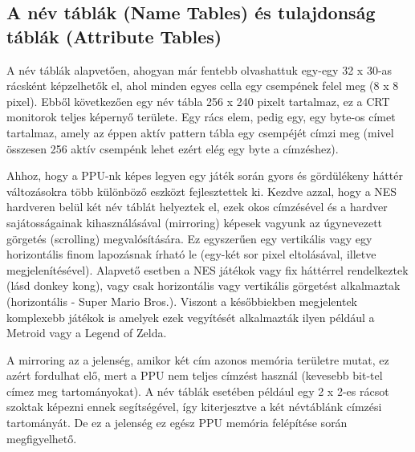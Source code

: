 	\subsection{A név táblák (Name Tables) és tulajdonság táblák (Attribute Tables)}
	\label{sec:NT-AT-mirroring}
	
	A név táblák alapvetően, ahogyan már fentebb olvashattuk egy-egy 32 x 30-as rácsként képzelhetők el, ahol minden egyes cella egy csempének felel meg (8 x 8 pixel). Ebből következően egy név tábla 256 x 240 pixelt tartalmaz, ez a CRT monitorok teljes képernyő területe. Egy rács elem, pedig egy, egy byte-os címet tartalmaz, amely az éppen aktív pattern tábla egy csempéjét címzi meg (mivel összesen 256 aktív csempénk lehet ezért elég egy byte a címzéshez).
	
	Ahhoz, hogy a PPU-nk képes legyen egy játék során gyors és gördülékeny háttér változásokra több különböző eszközt fejlesztettek ki. Kezdve azzal, hogy a NES hardveren belül két név táblát helyeztek el, ezek okos címzésével és a hardver sajátosságainak kihasználásával (mirroring) képesek vagyunk az úgynevezett görgetés (scrolling) megvalósítására. Ez egyszerűen egy vertikális vagy egy horizontális finom lapozásnak írható le (egy-két sor pixel eltolásával, illetve megjelenítésével). Alapvető esetben a NES játékok vagy fix háttérrel rendelkeztek (lásd donkey kong), vagy csak horizontális vagy vertikális görgetést alkalmaztak (horizontális - Super Mario Bros.). Viszont a későbbiekben megjelentek komplexebb játékok is amelyek ezek vegyítését alkalmazták ilyen például a Metroid vagy a Legend of Zelda.
	
	A mirroring az a jelenség, amikor két cím azonos memória területre mutat, ez azért fordulhat elő, mert a PPU nem teljes címzést használ (kevesebb bit-tel címez meg tartományokat). A név táblák esetében például egy 2 x 2-es rácsot szoktak képezni ennek segítségével, így kiterjesztve a két névtáblánk címzési tartományát. De ez a jelenség ez egész PPU memória felépítése során megfigyelhető.
	
